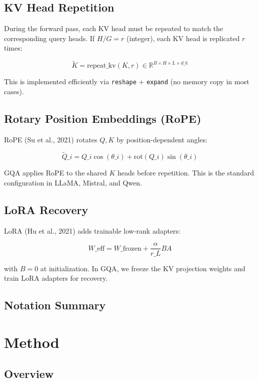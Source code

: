 \subsection{KV Head Repetition}

During the forward pass, each KV head must be repeated to match the 
corresponding query heads. If $H / G = r$ (integer), each KV head is 
replicated $r$ times:

\[
\tilde{K} = \text{repeat\_kv}(K, r) \in \mathbb{R}^{B \times H \times L \times d\_h}
\tag{3.8}
\]

This is implemented efficiently via \texttt{reshape} + \texttt{expand} (no memory copy 
in most cases).

\subsection{Rotary Position Embeddings (RoPE)}

RoPE (Su et al., 2021) rotates $Q, K$ by position-dependent angles:

\[
\tilde{Q}\_i = Q\_i \cos(\theta\_i) + \text{rot}(Q\_i) \sin(\theta\_i)
\tag{3.9}
\]

GQA applies RoPE to the shared $K$ heads before repetition. This is the 
standard configuration in LLaMA, Mistral, and Qwen.

\subsection{LoRA Recovery}

LoRA (Hu et al., 2021) adds trainable low-rank adapters:

\[
W\_\text{eff} = W\_\text{frozen} + \frac{\alpha}{r\_L} B A
\tag{3.10}
\]

with $B = 0$ at initialization. In GQA, we freeze the KV projection weights 
and train LoRA adapters for recovery.

\subsection{Notation Summary}



\section{Method}

\subsection{Overview}

